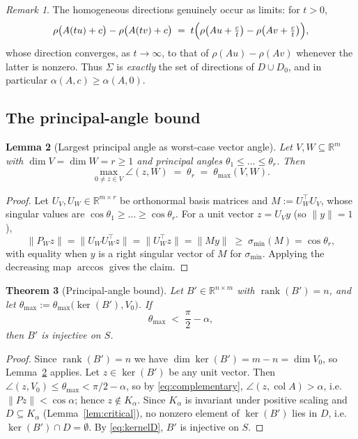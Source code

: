 \documentclass[11pt]{article}
\numberwithin{equation}{section}
\newtheorem{theorem}{Theorem}[section]
\newtheorem{lemma}[theorem]{Lemma}
\theoremstyle{remark}
\newtheorem{remark}[theorem]{Remark}
\newcommand{\R}{\mathbb{R}}
\DeclareMathOperator{\col}{col}
\DeclareMathOperator{\rank}{rank}
\newcommand{\norm}[1]{\lVert #1\rVert}
\newcommand{\Kal}{K_{\alpha}}
\begin{document}
\begin{remark}\label{rem:homogeneous}
The homogeneous directions genuinely occur as limits: for $t>0$,
\[
\rho\bigl(A(tu)+c\bigr)-\rho\bigl(A(tv)+c\bigr)\;=\;t\Bigl(\rho\bigl(Au+\tfrac{c}{t}\bigr)-\rho\bigl(Av+\tfrac{c}{t}\bigr)\Bigr),
\]
whose direction converges, as $t\to\infty$, to that of $\rho(Au)-\rho(Av)$ whenever the latter is nonzero. Thus $\Sigma$ is \emph{exactly} the set of directions of $D\cup D_0$, and in particular $\alpha(A,c)\ge\alpha(A,0)$.
\end{remark}

\subsection{The principal-angle bound}

\begin{lemma}[Largest principal angle as worst-case vector angle]\label{lem:worst}
Let $V,W\subseteq\R^m$ with $\dim V=\dim W=r\ge 1$ and principal angles $\theta_1\le\dots\le\theta_r$. Then
\[
\max_{0\ne z\in V}\angle(z,W)\;=\;\theta_r\;=\;\theta_{\max}(V,W).
\]
\end{lemma}

\begin{proof}
Let $U_V,U_W\in\R^{m\times r}$ be orthonormal basis matrices and $M:=U_W^{\top}U_V$, whose singular values are $\cos\theta_1\ge\dots\ge\cos\theta_r$. For a unit vector $z=U_V y$ (so $\norm{y}=1$),
\[
\norm{P_W z}=\norm{U_W U_W^{\top}z}=\norm{U_W^{\top}z}=\norm{My}\;\ge\;\sigma_{\min}(M)=\cos\theta_r ,
\]
with equality when $y$ is a right singular vector of $M$ for $\sigma_{\min}$. Applying the decreasing map $\arccos$ gives the claim.
\end{proof}

\begin{theorem}[Principal-angle bound]\label{thm:angle}
Let $B'\in\R^{n\times m}$ with $\rank(B')=n$, and let $\theta_{\max}:=\theta_{\max}\bigl(\ker(B'),V_0\bigr)$. If
\[
\theta_{\max}\;<\;\frac{\pi}{2}-\alpha ,
\]
then $B'$ is injective on $S$.
\end{theorem}

\begin{proof}
Since $\rank(B')=n$ we have $\dim\ker(B')=m-n=\dim V_0$, so Lemma~\ref{lem:worst} applies. Let $z\in\ker(B')$ be any unit vector. Then $\angle(z,V_0)\le\theta_{\max}<\pi/2-\alpha$, so by \eqref{eq:complementary}, $\angle(z,\col A)>\alpha$, i.e.\ $\norm{Pz}<\cos\alpha$; hence $z\notin\Kal$. Since $\Kal$ is invariant under positive scaling and $D\subseteq\Kal$ (Lemma~\ref{lem:critical}), no nonzero element of $\ker(B')$ lies in $D$, i.e.\ $\ker(B')\cap D=\emptyset$. By \eqref{eq:kernelD}, $B'$ is injective on $S$.
\end{proof}
\end{document}

